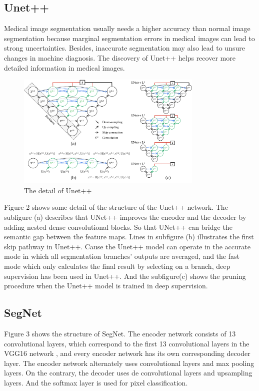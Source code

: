 \documentclass{article}
\begin{document}
\subsection{Unet++}
Medical image segmentation usually needs a higher accuracy than normal image segmentation because marginal segmentation errors in medical images can lead to strong uncertainties.
Besides, inaccurate segmentation may also lead to unsure changes in machine diagnosis.\cite{DBLP:journals/corr/abs-1807-10165}
The discovery of Unet++ helps recover more detailed information in medical images.


\begin{figure}[H]
    \centering
    \includegraphics[width = 3.5in]{Unet++}
    \caption{The detail of Unet++}
    \label{The detail of Unet++}
\end{figure}


Figure 2 shows some detail of the structure of the Unet++ network.
The subfigure (a) describes that UNet++ improves the encoder and the decoder by adding nested dense convolutional blocks.
So that UNet++ can bridge the semantic gap between the feature maps.
Lines in subfigure (b) illustrates the first skip pathway in Unet++.
Cause the Unet++ model can operate in the accurate mode in which all segmentation branches’ outputs are averaged, and the fast mode which only calculates the final result by selecting on a branch, deep supervision has been used in Unet++.
And the subfigure(c) shows the pruning procedure when the Unet++ model is trained in deep supervision.\cite{DBLP:journals/corr/abs-1807-10165,zhou2020unet}

\subsection{SegNet}
Figure 3 shows the structure of SegNet.
The encoder network consists of 13 convolutional layers, which correspond to the first 13 convolutional layers in the VGG16 network \cite{simonyan2014very}, and every encoder network has its own corresponding decoder layer.\cite{DBLP:journals/corr/BadrinarayananK15}
The encoder network alternately uses convolutional layers and max pooling layers. On the contrary, the decoder uses de convolutional layers and upsampling layers.
And the softmax layer is used for pixel classification.
\end{document}
